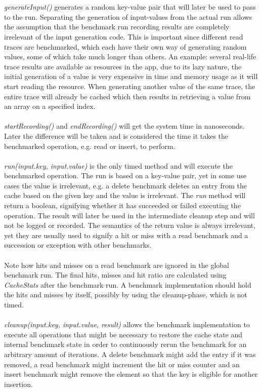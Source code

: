 \documentclass[pdftex,a4paper,12pt,twoside]{report}
\begin{document}
\\\\
\emph{generateInput()} generates a random key-value pair that will later be used to pass to the run. Separating the generation of input-values from the actual run allows the assumption that the benchmark run recording results are completely irrelevant of the input generation code. This is important since different read traces are benchmarked, which each have their own way of generating random values, some of which take much longer than others. An example: several real-life trace results are available as resources in the app, due to its lazy nature, the initial generation of a value is very expensive in time and memory usage as it will start reading the resource. When generating another value of the same trace, the entire trace will already be cached which then results in retrieving a value from an array on a specified index.
\\\\
\emph{startRecording()} and \emph{endRecording()} will get the system time in nanoseconds. Later the difference will be taken and is considered the time it takes the benchmarked operation, e.g. read or insert, to perform.
\\\\
\emph{run(input.key, input.value)} is the only timed method and will execute the benchmarked operation. The run is based on a key-value pair, yet in some use cases the value is irrelevant, e.g. a delete benchmark deletes an entry from the cache based on the given key and the value is irrelevant. The \emph{run} method will return a boolean, signifying whether it has succeeded or failed executing the operation. The result will later be used in the intermediate cleanup step and will not be logged or recorded. The semantics of the return value is always irrelevant, yet they are usually used to signify a hit or miss with a read benchmark and a succession or exception with other benchmarks.
\\\\
Note how hits and misses on a read benchmark are ignored in the global benchmark run. The final hits, misses and hit ratio are calculated using \emph{CacheStats} after the benchmark run. A benchmark implementation should hold the hits and misses by itself, possibly by using the cleanup-phase, which is not timed.
\\\\
\emph{cleanup(input.key, input.value, result)} allows the benchmark implementation to execute all operations that might be necessary to restore the cache state and internal benchmark state in order to continuously rerun the benchmark for an arbitrary amount of iterations. A delete benchmark might add the entry if it was removed, a read benchmark might increment the hit or miss counter and an insert benchmark might remove the element so that the key is eligible for another insertion.
\end{document}

